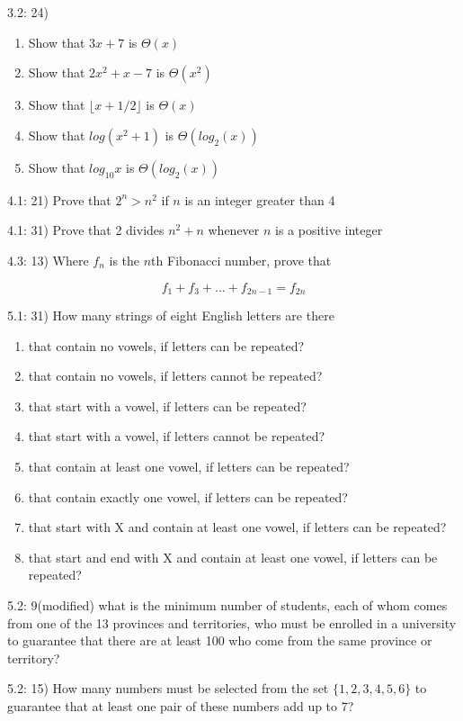 \documentclass{article}
\begin{document}
3.2: 24)

\begin{enumerate}[label=\alph{enumi})]
\item Show that $3x + 7$ is $\Theta (x)$
\item Show that $2x^2+x-7$ is $\Theta (x^2)$
\item Show that $\lfloor x + 1/2 \rfloor$ is $\Theta (x)$
\item Show that $log(x^2+1)$ is $\Theta (log_2(x))$
\item Show that $log_{10}x$ is $\Theta (log_2(x))$
\end{enumerate}

4.1: 21) Prove that $2^n > n^2$ if $n$ is an integer greater than 4

4.1: 31) Prove that 2 divides $n^2 + n$ whenever $n$ is a positive integer

4.3: 13) Where $f_n$ is the $n$th Fibonacci number, prove that

\[
f_1 + f_3 + ... + f_{2n-1} = f_{2n}
\]

5.1: 31) How many strings of eight English letters are there

\begin{enumerate}[label=\alph{enumi})]
\item that contain no vowels, if letters can be repeated?
\item that contain no vowels, if letters cannot be repeated?
\item that start with a vowel, if letters can be repeated?
\item that start with a vowel, if letters cannot be repeated?
\item that contain at least one vowel, if letters can be repeated?
\item that contain exactly one vowel, if letters can be repeated?
\item that start with X and contain at least one vowel, if letters can be repeated?
\item that start and end with X and contain at least one vowel, if
  letters can be repeated?
\end{enumerate}

5.2: 9(modified) what is the minimum number of students, each of whom
comes from one of the 13 provinces and territories, who must be
enrolled in a university to guarantee that there are at least 100 who
come from the same province or territory?

5.2: 15) How many numbers must be selected from the set
$\{1,2,3,4,5,6\}$ to guarantee that at least one pair of these numbers
add up to 7?
\end{document}
